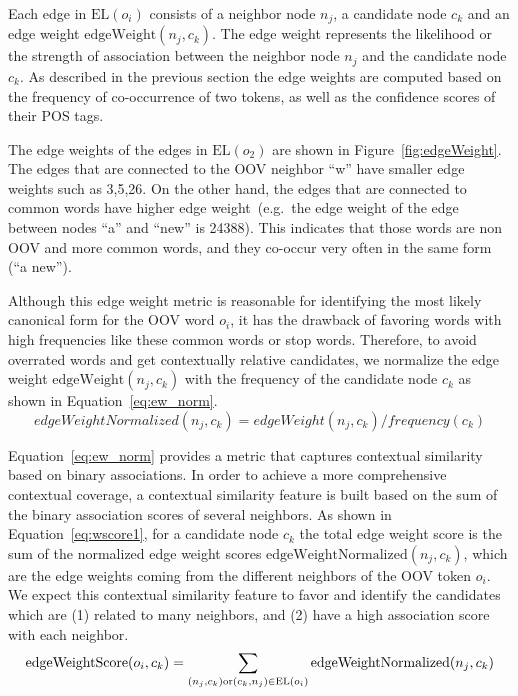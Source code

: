\documentclass[a4paper,onesided,12pt]{report}
\begin{document}
Each edge in $\text{EL}(o_i)$ consists of a neighbor node $n_j$, a candidate node $c_k$ and an edge weight $\text{edgeWeight}(n_j,c_k)$. The edge weight represents the likelihood or the strength of association between the neighbor node $n_j$ and the candidate node $c_k$. As described in the previous section the edge weights are computed based on the frequency of co-occurrence of two tokens, as well as the confidence scores of their POS tags.

The edge weights of the edges in $\text{EL}(o_2)$ are shown in Figure~\ref{fig:edgeWeight}. The edges that are connected to the OOV neighbor ``w'' have smaller edge weights such as 3,5,26. On the other hand, the edges that are connected to common words have higher edge weight~(e.g.~the edge weight of the edge between nodes ``a'' and ``new'' is 24388). This indicates that those words are non OOV and more common words, and they co-occur very often in the same form (``a new'').

Although this edge weight metric is reasonable for identifying the most likely canonical form for the OOV word $o_i$, it has the drawback of favoring words with high frequencies like these common words or stop words. Therefore, to avoid overrated words and get contextually relative candidates, we normalize the edge weight $\text{edgeWeight}(n_j,c_k)$ with the frequency of the candidate node $c_k$ as shown in Equation~\ref{eq:ew_norm}.
\begin{equation}
edgeWeightNormalized(n_j,c_k) = edgeWeight(n_j,c_k) / frequency(c_k)
\label{eq:ew_norm}
\end{equation}

Equation~\ref{eq:ew_norm} provides a metric that captures contextual similarity based on binary associations.
In order to achieve a more comprehensive contextual coverage, a contextual similarity feature is built based on the sum of the binary association scores of several neighbors. As shown in Equation~\ref{eq:wscore1}, for a candidate node $c_k$ the total edge weight score is the sum of the normalized edge weight scores $\text{edgeWeightNormalized}(n_j,c_k)$, which are the edge weights coming from the different neighbors of the OOV token $o_i$. We expect this contextual similarity feature to favor and identify the candidates which are (1) related to many neighbors, and (2) have a high association score with each neighbor.
\begin{equation}
\text{edgeWeightScore}(o_i,c_k) = \sum_{(n_j,c_k) \text{or} (c_k,n_j) \in \text{EL}(o_i)}{\text{edgeWeightNormalized}(n_j,c_k)} \\\\
\label{eq:wscore1}
\end{equation}
\end{document}
